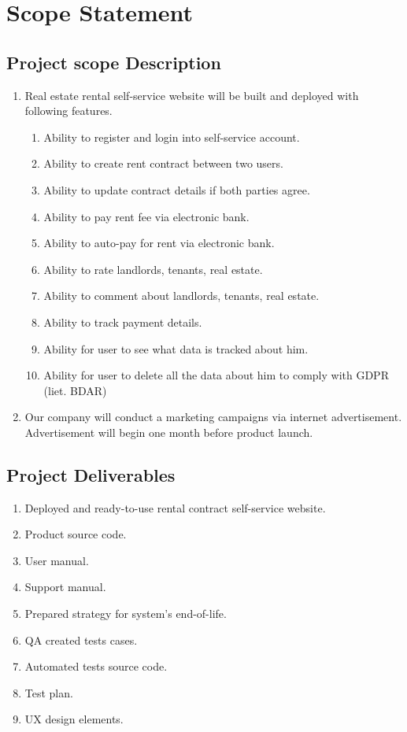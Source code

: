 \documentclass{VUMIFPSkursinis}
\begin{document}
\section{Scope Statement}
	\subsection{Project scope Description}
		\begin{enumerate}
			\item{Real estate rental self-service website will be built and deployed with following features.}
				\begin{enumerate}
					\item{Ability to register and login into self-service account.}
					\item{Ability to create rent contract between two users.}
					\item{Ability to update contract details if both parties agree.}
					\item{Ability to pay rent fee via electronic bank.}
					\item{Ability to auto-pay for rent via electronic bank.}
					\item{Ability to rate landlords, tenants, real estate.}
					\item{Ability to comment about landlords, tenants, real estate.}
					\item{Ability to track payment details.}
					\item{Ability for user to see what data is tracked about him.}
					\item{Ability for user to delete all the data about him to comply with GDPR (liet. BDAR)}
				\end{enumerate}
			\item{Our company will conduct a marketing campaigns via internet advertisement. Advertisement will begin one month before product launch.}
		\end{enumerate}

	\subsection{Project Deliverables}
		\begin{enumerate}
			\item{Deployed and ready-to-use rental contract self-service website.}
			\item{Product source code.}
			\item{User manual.}
			\item{Support manual.}
			\item{Prepared strategy for system's end-of-life.}
			\item{QA created tests cases.}
			\item{Automated tests source code.}
			\item{Test plan.}
			\item{UX design elements.}
		\end{enumerate}
\end{document}
